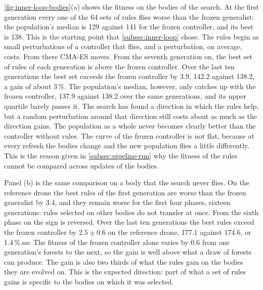 \autoref{fig:inner-loop-bodies}(a) shows the fitness on the bodies of the search. At the first generation every one of the 64 sets of rules flies worse than the frozen generalist: the population's median is 129 against 141 for the frozen controller, and its best is 138. This is the starting point that \autoref{subsec:inner-loop} chose. The rules begin as small perturbations of a controller that flies, and a perturbation, on average, costs. From there CMA-ES moves. From the seventh generation on, the best set of rules of each generation is above the frozen controller. Over the last ten generations the best set exceeds the frozen controller by 3.9, 142.2 against 138.2, a gain of about 3\,\%. The population's median, however, only catches up with the frozen controller, 137.9 against 138.2 over the same generations, and its upper quartile barely passes it. The search has found a direction in which the rules help, but a random perturbation around that direction still costs about as much as the direction gains. The population as a whole never becomes clearly better than the controller without rules. The curve of the frozen controller is not flat, because at every refresh the bodies change and the new population flies a little differently. This is the reason given in \autoref{subsec:pipeline-run} why the fitness of the rules cannot be compared across updates of the bodies.

Panel (b) is the same comparison on a body that the search never flies. On the reference drone the best rules of the first generation are worse than the frozen generalist by 3.4, and they remain worse for the first four phases, sixteen generations: rules selected on other bodies do not transfer at once. From the sixth phase on the sign is reversed. Over the last ten generations the best rules exceed the frozen controller by $2.5 \pm 0.6$ on the reference drone, 177.1 against 174.6, or 1.4\,\%.ssc  The fitness of the frozen controller alone varies by 0.6 from one generation's forests to the next, so the gain is well above what a draw of forests can produce. The gain is also two thirds of what the rules gain on the bodies they are evolved on. This is the expected direction: part of what a set of rules gains is specific to the bodies on which it was selected.


